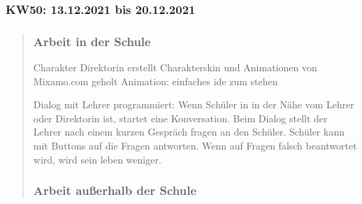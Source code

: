 
\subsubsection{KW50: 13.12.2021 bis 20.12.2021}
\begin{quote}
	\subsubsection*{Arbeit in der Schule}
	Charakter Direktorin erstellt
	Charakterskin und Animationen von Mixamo.com geholt
	Animation: einfaches ide zum stehen
	
	
	
	Dialog mit Lehrer programmiert: Wenn Schüler in in der Nähe vom Lehrer oder Direktorin ist, startet eine Konversation. 
	Beim Dialog stellt der Lehrer nach einem kurzen Gespräch fragen an den Schüler.
	Schüler kann mit Buttons auf die Fragen antworten.
	Wenn auf Fragen falsch beantwortet wird, wird sein leben weniger.
	\subsubsection*{Arbeit außerhalb der Schule}


\end{quote}
